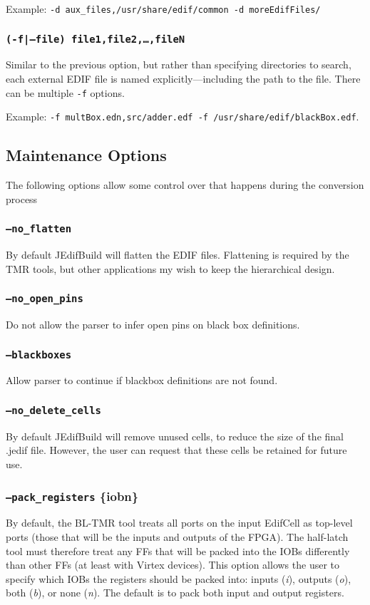 Example: \texttt{-d aux\_files,/usr/share/edif/common -d
  moreEdifFiles/}

\subsubsection{\texttt{(-f|--file) file1,file2,\ldots,fileN}}
Similar to the previous option, but rather than specifying directories to 
search, each external EDIF file is named explicitly---including the path to the 
file. There can be multiple \texttt{-f} options. 

Example: \texttt{-f multBox.edn,src/adder.edf -f /usr/share/edif/blackBox.edf}.

\subsection{Maintenance Options}
The following options allow some control over that happens during the 
conversion process
  
\subsubsection{\texttt{--no\_flatten}}
By default JEdifBuild will flatten the EDIF files. Flattening is required by the 
TMR tools, but other applications my wish to keep the hierarchical
design. 

\subsubsection{\texttt{--no\_open\_pins}}
Do not allow the parser to infer open pins on black box definitions.

\subsubsection{\texttt{--blackboxes}}
Allow parser to continue if blackbox definitions are not found.

\subsubsection{\texttt{--no\_delete\_cells}}
By default JEdifBuild will remove unused cells, to reduce the size of the final
.jedif file. However, the user can request that these cells be retained for 
future use.

\subsubsection{\texttt{--pack\_registers} \{i\textbar o\textbar b\textbar n\}}
By default, the BL-TMR tool treats all ports on the input EdifCell as top-level
ports (those that will be the inputs and outputs of the FPGA). The half-latch 
tool must therefore treat any FFs that will be packed into the IOBs differently
than other FFs (at least with Virtex devices). This option allows the user to
specify which IOBs the registers should be packed into: inputs (\emph{i}),
outputs (\emph{o}), both (\emph{b}), or none (\emph{n}). The default is to pack
both input and output registers.


